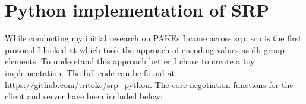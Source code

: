 \chapter{Python implementation of SRP}

While conducting my initial research on PAKEs I came across \gls{srp}\cite{srp}.
\gls{srp} is the first protocol I looked at which took the approach of encoding values as \gls{dh} group elements.
To understand this approach better I chose to create a toy implementation.
The full code can be found at \url{https://github.com/tritoke/srp_python}.
The core negotiation functions for the client and server have been included below:


